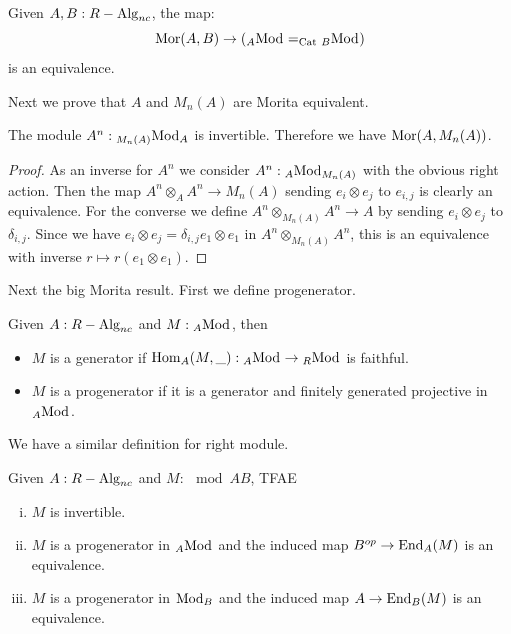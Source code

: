 \begin{corollary}
Given $A,B:R-{\mathrm{Alg}}_{nc}$, the map:
\[{\mathrm{Mor}}(A,B) \to ({}_{A}{\mathrm{Mod}}_{}=_{\mathrm{Cat}}{}_{B}{\mathrm{Mod}}_{})\]
is an equivalence.
\end{corollary}

Next we prove that $A$ and $M_n(A)$ are Morita equivalent.

\begin{lemma}\label{matrix-morita-equivalence}
The module $A^n:{}_{M_n(A)}{\mathrm{Mod}}_{A}$ is invertible. Therefore we have ${\mathrm{Mor}}(A,M_n(A))$.
\end{lemma}

\begin{proof}
As an inverse for $A^n$ we consider $A^n:{}_{A}{\mathrm{Mod}}_{M_n(A)}$ with the obvious right action. Then the map $A^n\otimes_AA^n \to M_n(A)$ sending $e_i\otimes e_j$ to $e_{i,j}$ is clearly an equivalence. For the converse we define $A^n\otimes_{M_n(A)}A^n\to A$ by sending $e_i\otimes e_j$ to $\delta_{i,j}$. Since we have $e_i\otimes e_j = \delta_{i,j} e_1\otimes e_1$ in $A^n\otimes_{M_n(A)}A^n$, this is an equivalence with inverse $r\mapsto r (e_1\otimes e_1)$.
\end{proof}

Next the big Morita result. First we define progenerator.

\begin{definition}
Given $A:R-{\mathrm{Alg}}_{nc}$ and $M:{}_{A}{\mathrm{Mod}}_{}$, then 
\begin{itemize}
\item $M$ is a generator if $\mathrm{Hom}_A(M,\_):{}_{A}{\mathrm{Mod}}_{}\to {}_{R}{\mathrm{Mod}}_{}$ is faithful.
\item $M$ is a progenerator if it is a generator and finitely generated projective in ${}_{A}{\mathrm{Mod}}_{}$.
\end{itemize}
We have a similar definition for right module.
\end{definition}

\begin{theorem}\label{morita-main-theorem}
Given $A:R-{\mathrm{Alg}}_{nc}$ and $M:\mod{A}{B}$, TFAE
\begin{enumerate}[(i)]
\item $M$ is invertible.
\item $M$ is a progenerator in ${}_{A}{\mathrm{Mod}}_{}$ and the induced map $B^{op}\to {\mathrm{End}}_A(M)$ is an equivalence.
\item $M$ is a progenerator in ${}_{}{\mathrm{Mod}}_{B}$ and the induced map $A\to {\mathrm{End}}_B(M)$ is an equivalence. 
\end{enumerate}
\end{theorem}

